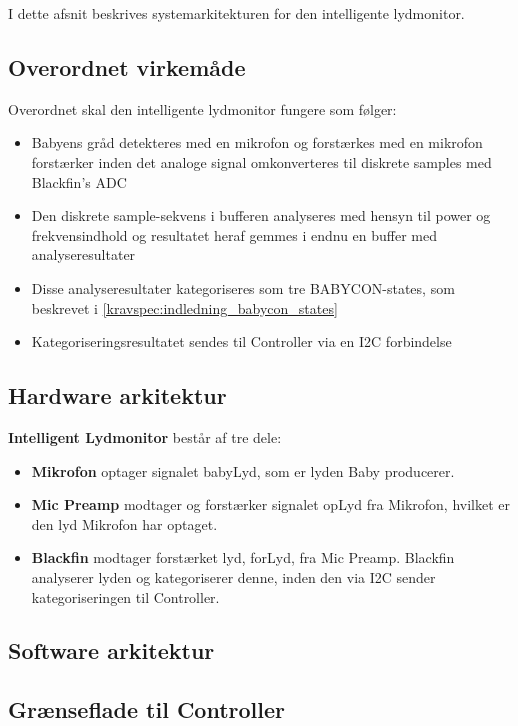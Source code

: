 
I dette afsnit beskrives systemarkitekturen for den intelligente lydmonitor.

\subsection*{Overordnet virkemåde}
Overordnet skal den intelligente lydmonitor fungere som følger:
\begin{itemize}
	\item Babyens gråd detekteres med en mikrofon og forstærkes med en mikrofon forstærker inden det analoge signal omkonverteres til diskrete samples med Blackfin's ADC
	\item Den diskrete sample-sekvens i bufferen analyseres med hensyn til power og frekvensindhold og resultatet heraf gemmes i endnu en buffer med analyseresultater
	\item Disse analyseresultater kategoriseres som tre BABYCON-states, som beskrevet i \ref{kravspec:indledning_babycon_states} 
	\item Kategoriseringsresultatet sendes til Controller via en I2C forbindelse
\end{itemize}


\subsection*{Hardware arkitektur}

\textbf{Intelligent Lydmonitor} består af tre dele: 
\begin{itemize}
\item \textbf{Mikrofon} optager signalet babyLyd, som er lyden Baby producerer. 
\item \textbf{Mic Preamp} modtager og forstærker signalet opLyd fra Mikrofon, hvilket er den lyd Mikrofon har optaget. 
\item \textbf{Blackfin} modtager forstærket lyd, forLyd, fra Mic Preamp. Blackfin analyserer lyden og kategoriserer denne, inden den via I2C sender kategoriseringen til Controller. 
\end{itemize}





\subsection*{Software arkitektur}

\subsection*{Grænseflade til Controller}


